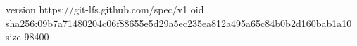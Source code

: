 version https://git-lfs.github.com/spec/v1
oid sha256:09b7a71480204c06f88655e5d29a5ec235ea812a495a65c84b0b2d160bab1a10
size 98400
